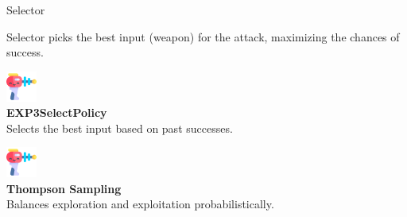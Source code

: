 \documentclass{beamer}
\begin{document}
\begin{frame}{Selector}
    \centering
    \begin{block}{Selector}
    picks the best input (weapon) for the attack, maximizing the chances of success.
    \end{block}
    \vspace{0.3cm} %

    \begin{minipage}{0.3\textwidth}
        \centering
        \begin{tcolorbox}[
            colframe=blue!70, 
            colback=blue!10, 
            rounded corners, 
            width=\textwidth, 
            sharp corners=north,
            boxsep=1pt, %
            text width=2.8cm, %
            height=4.5cm, %
        ]
            \includegraphics[width=1cm]{stickers/weapon1.png} \\ %
            \textbf{EXP3SelectPolicy} \\
            Selects the best input based on past successes.
        \end{tcolorbox}
    \end{minipage}%
    \hfill
    \begin{minipage}{0.3\textwidth}
        \centering
        \begin{tcolorbox}[
            colframe=green!70, 
            colback=green!10, 
            rounded corners, 
            width=\textwidth, 
            sharp corners=north,
            boxsep=1pt, 
            text width=2.8cm, 
            height=4.5cm,
        ]
            \includegraphics[width=1cm]{stickers/weapon1.png} \\ %
            \textbf{Thompson Sampling} \\
            Balances exploration and exploitation probabilistically.
        \end{tcolorbox}
    \end{minipage}%
    \hfill

\end{frame}
\end{document}
